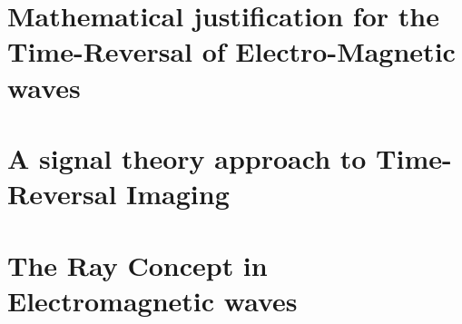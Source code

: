 \section{Mathematical justification for the Time-Reversal of Electro-Magnetic waves}

\section{A signal theory approach to Time-Reversal Imaging}

\section{The Ray Concept in Electromagnetic waves}


